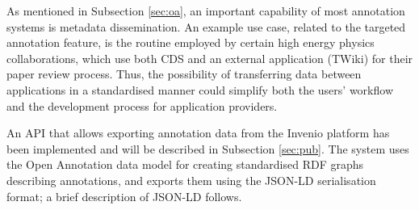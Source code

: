 
As mentioned in Subsection \ref{sec:oa}, an important capability of most
annotation systems is metadata dissemination. An example use case, related to
the targeted annotation feature, is the routine employed by certain high energy
physics collaborations, which use both CDS and an external application
(TWiki) for their paper review process. Thus, the possibility of transferring
data between applications in a standardised manner could simplify both the
users' workflow and the development process for application providers.

An API that allows exporting annotation data from the Invenio platform has been
implemented and will be described in Subsection \ref{sec:pub}. The system uses
the Open Annotation data model for creating standardised RDF graphs describing
annotations, and exports them using the JSON-LD serialisation format; a brief
description of JSON-LD follows.
